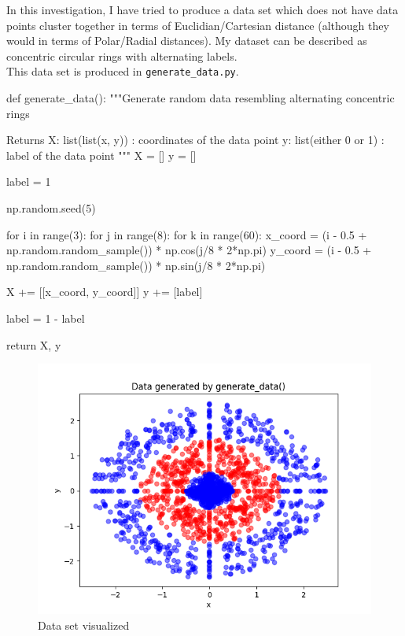 \documentclass{article}
\begin{document}
In this investigation, I have tried to produce a data set which does not have data points cluster together in terms of Euclidian/Cartesian distance (although they would in terms of Polar/Radial distances). My dataset can be described as concentric circular rings with alternating labels.\\

This data set is produced in \texttt{generate\_data.py}.\\

\begin{python}
def generate_data():
    """Generate random data resembling alternating concentric rings

    Returns
    X: list(list(x, y)) : coordinates of the data point
    y: list(either 0 or 1) : label of the data point
    """
    X = []
    y = []

    label = 1

    np.random.seed(5)

    for i in range(3):
        for j in range(8):
            for k in range(60):
                x_coord = (i - 0.5 + np.random.random_sample()) * np.cos(j/8 * 2*np.pi)
                y_coord = (i - 0.5 + np.random.random_sample()) * np.sin(j/8 * 2*np.pi)

                X += [[x_coord, y_coord]]
                y += [label]

        label = 1 - label

    return X, y
\end{python}

\begin{figure}[h!]
    \centering
    \includegraphics[scale=0.7]{data.png}
    \caption{Data set visualized}
    \label{fig:fig3}
\end{figure}
\end{document}
